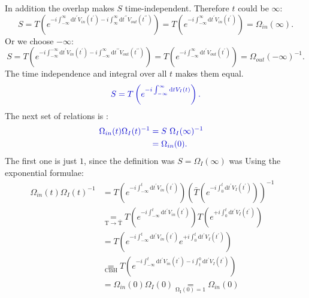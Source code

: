 \documentclass[12pt, titlepage]{article}
\begin{document}
In addition the overlap makes $ S $ time-independent. Therefore $ t $ could be $ \infty $:
\begin{equation}\label{eq:S_equal_in_infty}
S=T\left( e^{-i\int_{-\infty}^{\infty}\mathrm{d}t^{\prime} V_{in}(t^{\prime})
	 -i\int_{\infty}^{\infty}\mathrm{d}t^{\prime \prime} V_{out}(t^{\prime \prime})} \right)
=T\left( e^{-i\int_{-\infty}^{\infty}\mathrm{d}t^{\prime} V_{in}(t^{\prime})}\right)
=\Omega_{in}(\infty).
\end{equation}
Or we choose $ -\infty $:
\begin{equation}
S=T\left( e^{-i\int_{-\infty}^{-\infty}\mathrm{d}t^{\prime} V_{in}(t^{\prime})
	 -i\int_{-\infty}^{\infty}\mathrm{d}t^{\prime \prime} V_{out}(t^{\prime \prime})} \right)
=T\left( e^{-i\int_{-\infty}^{\infty}\mathrm{d}t^{\prime} V_{out}(t^{\prime})}\right)
=\Omega_{out}(-\infty)^{-1}.
\end{equation}
The time independence and integral over all $ t $ makes them equal. 
\begin{equation}\label{eq:S_equal_in_plus_minus_infty}
\textcolor[RGB]{0,0,204}{
S=T\left( e^{-i\int_{-\infty}^{\infty}\mathrm{d}t V_{I}(t)}\right)
.}
\end{equation}
The next set of relations is :
\begin{subequations}
\textcolor[RGB]{0,0,204}{
\begin{align}
	\Omega_{in}(t)\Omega_{I}(t)^{-1}
	&=S\ \Omega_{I}(\infty)^{-1}
	&\\
	&=
	\Omega_{in}(0)	.
\end{align}
}
\end{subequations}
The first one is just $ 1 $, since the  definition was $ S = \Omega_{I}(\infty) $ was 
Using the exponential formulae:
\begin{subequations}
\begin{align}
	\Omega_{in}(t)\Omega_{I}(t)^{-1}&=
T\left( e^{-i\int_{-\infty}^{t}\mathrm{d}t^{\prime} V_{in}(t^{\prime})} \right)
 \left( \bar{T}\left( e^{-i\int_{0}^{t}\mathrm{d}t^{\prime} V_{I}(t^{\prime})} \right)
	\right)^{-1}
	&\\
	 &\underset{\mathrm{T\rightarrow\bar{T} }}{=} 
	 T\left( e^{-i\int_{-\infty}^{t}\mathrm{d}t^{\prime} V_{in}(t^{\prime})} \right)
  T\left( e^{+i\int_{0}^{t}\mathrm{d}t^{\prime} V_{I}(t^{\prime})} \right)
  &\\
  &=
  T\left( e^{-i\int_{-\infty}^{t}\mathrm{d}t^{\prime} V_{in}(t^{\prime})}
  e^{+i\int_{0}^{t}\mathrm{d}t^{\prime} V_{I}(t^{\prime})} \right)
  	&\\
	 &\underset{\mathrm{CBH}}{=} 
T\left( e^{-i\int_{-\infty}^{t}\mathrm{d}t^{\prime} V_{in}(t^{\prime})
 -i\int_{t}^{0}\mathrm{d}t^{\prime} V_{I}(t^{\prime}) }\right) 
  &\\
  &= 	\Omega_{in}(0) 	\Omega_{I}(0)\underset{\mathrm{\Omega_{I}(0)=1}}{=} 	\Omega_{in}(0)
\end{align}
\end{subequations}
\end{document}
